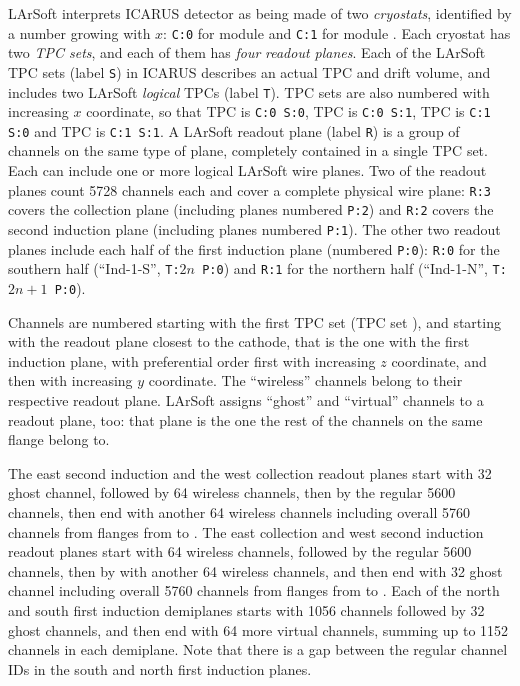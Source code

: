LArSoft interprets ICARUS detector as being made of two \emph{cryostats},
identified by a number growing with $x$:
\texttt{C:0} for module  and \texttt{C:1} for module .
Each cryostat has two \emph{TPC sets}, and each of them has \emph{four}
\emph{readout planes}.
Each of the LArSoft TPC sets (label \texttt{S}) in ICARUS describes an actual TPC and drift
volume, and includes two LArSoft \emph{logical} TPCs (label \texttt{T}).
TPC sets are also numbered with increasing $x$ coordinate, so that
TPC  is \texttt{C:0 S:0}, TPC  is \texttt{C:0 S:1},
TPC  is \texttt{C:1 S:0} and TPC  is \texttt{C:1 S:1}.
A LArSoft readout plane (label \texttt{R}) is a group of channels on the same type of plane,
completely contained in a single TPC set.
Each can include one or more logical LArSoft wire planes.
Two of the readout planes count 5728 channels each and cover a complete physical wire
plane: \texttt{R:3} covers the collection plane (including planes numbered \texttt{P:2})
and \texttt{R:2} covers the second induction plane (including planes numbered \texttt{P:1}).
The other two readout planes include each half of the first induction plane (numbered \texttt{P:0}):
\texttt{R:0} for the southern half (``Ind-1-S'', \texttt{T:$2n$ P:0})
and \texttt{R:1} for the northern half (``Ind-1-N'', \texttt{T:$2n+1$ P:0}).

Channels are numbered starting with the first TPC set (TPC set ),
and starting with the readout plane closest to the cathode,
that is the one with the first induction plane, with preferential order first
with increasing $z$ coordinate, and then with increasing $y$ coordinate.
The ``wireless'' channels belong to their respective readout plane.
LArSoft assigns ``ghost'' and ``virtual'' channels to a readout plane, too:
that plane is the one the rest of the channels on the same flange belong to.

The east second induction and the west collection readout planes start with 32 ghost channel,
followed by 64 wireless channels, then by the regular 5600 channels,
then end with another 64 wireless channels
including overall 5760 channels from flanges from  to .
The east collection  and west second induction readout planes start with 64 wireless channels,
followed by the regular 5600 channels,
then by with another 64 wireless channels, and then end with 32 ghost channel
including overall 5760 channels from flanges from  to .
Each of the north and south first induction demiplanes starts with 1056 channels
followed by 32 ghost channels, and then end with 64 more virtual channels,
summing up to 1152 channels in each demiplane.
Note that there is a gap between the regular channel IDs in the south
and north first induction planes.

